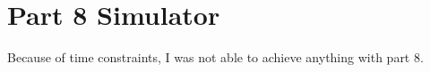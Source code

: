 \section{Part 8 Simulator}

Because of time constraints, I was not able to achieve anything with part 8.